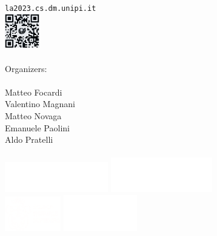 \documentclass[a4paper]{article}
\newcommand{\buh}[1]{\textsf{#1}\\}
\begin{document}
\begin{minipage}{0.45\textwidth}
    \vspace{6cm}
    \mbox{}\hspace{6.75cm}%
    {\tiny\texttt{la2023.cs.dm.unipi.it}}\\
    \mbox{}\hspace{7cm}\includegraphics*[height=1.5cm]{qr-bw.png}\hspace{-4cm}\mbox{}\\
    \vspace{-3cm}\\
    \Large
    \buh{Organizers:}
    \\
    \normalsize
    \textsf{
        Matteo Focardi\\
        Valentino Magnani\\
        Matteo Novaga\\
        Emanuele Paolini\\
        Aldo Pratelli
    }\\
    \small    
    \noindent
    \hspace{1cm}\\
    \mbox{}\hspace{-0cm}
    \includegraphics*[height=1.3cm]{matematica_dx_bianco.pdf}
    \includegraphics*[height=1.5cm]{marchio_unipi_orizz_white.png}\\
    \mbox{}\hspace{-0cm}
    \includegraphics*[height=1.5cm]{Sns-Scuola-Normale-Superiore-Pisa.png}
    \hspace{1.9cm}
    \includegraphics*[height=1.6cm]{logo_DIMAI_positivo-1-300x150.png}\\
    \mbox{}
    \end{minipage}
\\
\end{document}
